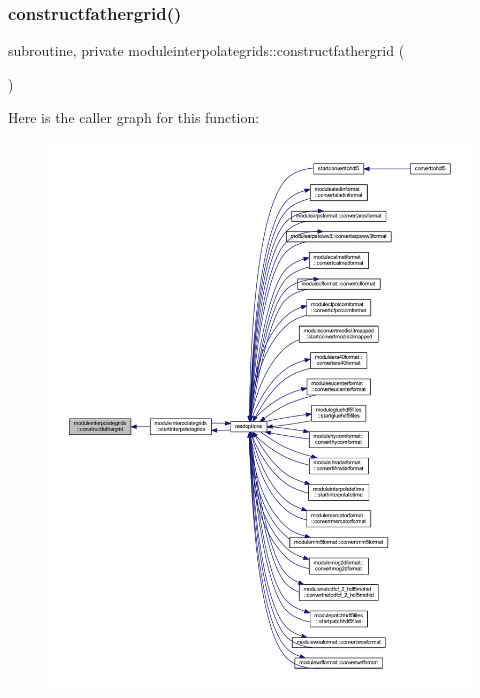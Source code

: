\subsubsection{\texorpdfstring{constructfathergrid()}{constructfathergrid()}}
{\footnotesize\ttfamily subroutine, private moduleinterpolategrids\+::constructfathergrid (\begin{DoxyParamCaption}{ }\end{DoxyParamCaption})\hspace{0.3cm}{\ttfamily [private]}}

Here is the caller graph for this function\+:\nopagebreak
\begin{figure}[H]
\begin{center}
\leavevmode
\includegraphics[width=350pt]{namespacemoduleinterpolategrids_a1563ccf4009718586332881b09394382_icgraph}
\end{center}
\end{figure}
\mbox{\label{namespacemoduleinterpolategrids_a3df578fd05d6020ac889661230172322}} 

